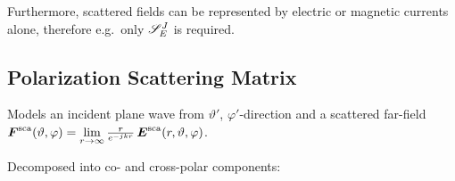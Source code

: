 Furthermore, scattered fields can be represented by electric or magnetic currents alone, therefore e.g.\ only $\DyadicS{E}{J}$ is required.

\subsection{Polarization Scattering Matrix}
Models an incident plane wave from $\vartheta'$, $\varphi'$-direction and a scattered far-field $\bs{F}^{\mathrm{sca}}(\vartheta, \varphi) = \lim\limits_{r\to\infty} \frac{r}{e^{-jkr}} \, \bs{E}^{\mathrm{sca}}(r, \vartheta, \varphi)$.

Decomposed into co- and cross-polar components:

